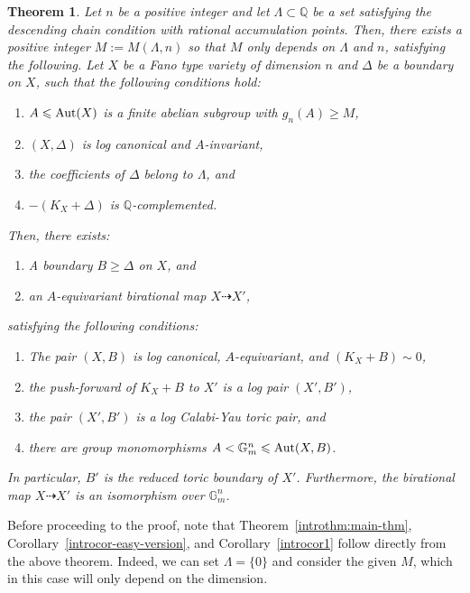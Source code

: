 \documentclass{amsart}
\renewcommand{\qq}{\mathbb{Q}}
\newtheorem{theorem}{Theorem}[section]
\theoremstyle{remark}
\numberwithin{equation}{section}
\begin{document}
\begin{theorem}\label{thm:FT-full-rank}
Let $n$ be a positive integer and
let $\Lambda\subset \qq$ be a set satisfying the descending chain condition with rational accumulation points.
Then, there exists a positive integer
$M:=M(\Lambda,n)$ 
so that $M$ only depends on $\Lambda$ and $n$,
satisfying the following.
Let $X$ be a Fano type variety of dimension $n$ and $\Delta$ be a boundary on $X$, such that the following conditions hold:
\begin{enumerate}
\item $A\leqslant {\rm Aut}(X)$ is a finite abelian subgroup with $g_n(A)\geq M$, 
\item $(X,\Delta)$ is log canonical and $A$-invariant,
\item the coefficients of $\Delta$ belong to $\Lambda$, and
\item $-(K_X+\Delta)$ is $\qq$-complemented.
\end{enumerate}
Then, there exists:
\begin{enumerate}
\item A boundary $B\geqslant \Delta$ on $X$, and
\item an $A$-equivariant birational map $X\dashrightarrow X'$, 
\end{enumerate}
satisfying the following conditions:
\begin{enumerate}
\item The pair $(X,B)$ is log canonical, $A$-equivariant, and 
$(K_X+B)\sim 0$,
\item the push-forward of $K_X+B$ to $X'$ is a log pair $(X',B')$,
\item the pair $(X',B')$ is a log Calabi-Yau toric pair, and
\item there are group monomorphisms
$A<\mathbb{G}_m^n\leqslant {\rm Aut}(X,B)$.
\end{enumerate}
In particular, $B'$ is the reduced toric boundary of $X'$.
Furthermore, the birational map $X\dashrightarrow X'$ is an isomorphism over $\mathbb{G}_m^n$.
\end{theorem}

Before proceeding to the proof,
note that Theorem~\ref{introthm:main-thm},
Corollary~\ref{introcor-easy-version}, 
and Corollary~\ref{introcor1} follow directly from the above theorem.
Indeed, we can set $\Lambda=\{0\}$
and consider the given $M$,
which in this case will only depend on the dimension.
\end{document}
